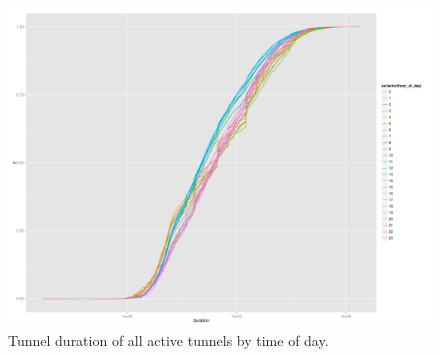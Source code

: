 \begin{figure}[htb]
  \centering
  \includegraphics[width=1.0\textwidth]{images/R-duration-activetunnels-hours-ecdf.pdf}
  \caption{Tunnel duration of all active tunnels by time of day.}
 \label{c4:fig:duration-timeofday-ecdf}
\end{figure}